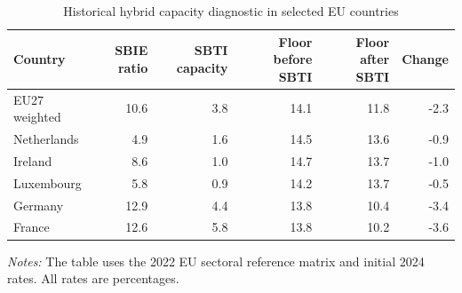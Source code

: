 \begin{table}[H]
\centering
\small
\setlength{\tabcolsep}{4pt}
\caption[Historical hybrid capacity diagnostic in selected EU countries]{Historical hybrid capacity diagnostic in selected EU countries}
\label{tab:stage2_sectoral_sbti}
\begin{tabular}{@{}lrrrrr@{}}
\toprule
Country & SBIE ratio & SBTI capacity & Floor before SBTI & Floor after SBTI & Change \\
\midrule
EU27 weighted & 10.6 & 3.8 & 14.1 & 11.8 & -2.3 \\
Netherlands &  4.9 & 1.6 & 14.5 & 13.6 & -0.9 \\
Ireland &  8.6 & 1.0 & 14.7 & 13.7 & -1.0 \\
Luxembourg &  5.8 & 0.9 & 14.2 & 13.7 & -0.5 \\
Germany & 12.9 & 4.4 & 13.8 & 10.4 & -3.4 \\
France & 12.6 & 5.8 & 13.8 & 10.2 & -3.6 \\
\bottomrule
\end{tabular}

\vspace{0.35em}
\noindent\begin{minipage}{\textwidth}
\footnotesize\raggedright\textit{Notes:} The table uses the 2022 EU sectoral reference matrix and initial 2024 rates. All rates are percentages.
\end{minipage}
\end{table}
